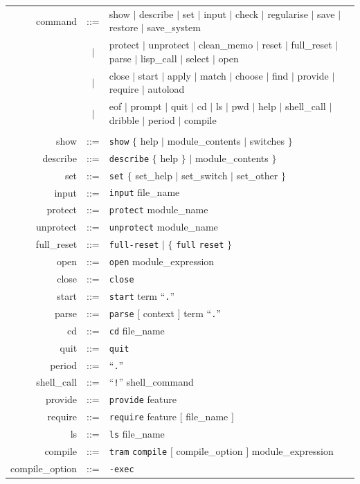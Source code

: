 \documentclass[a4paper]{memoir}
\begin{document}
\textit{}
\begin{tabular}{r c l}
  command &::=& show $|$ describe $|$ set $|$ input $|$ check $|$
    regularise $|$ save $|$ restore $|$ save\_system \\
  &$|$& protect $|$ unprotect $|$ clean\_memo $|$ reset $|$ full\_reset $|$
    parse $|$ lisp\_call $|$ select $|$ open \\
  &$|$& close $|$ start $|$ apply $|$ match $|$
    choose $|$ find $|$ provide $|$ require $|$ autoload \\
  &$|$& eof $|$ prompt $|$ quit $|$ cd $|$ ls $|$ pwd $|$ help $|$
    shell\_call $|$ dribble $|$ period $|$ compile \\
  \\
  show &::=& \verb|show| $\{$ help $|$ module\_contents $|$
    switches $\}$ \\
  describe &::=& \verb|describe| $\{$ help $\}$ $|$ module\_contents $\}$ \\
  set &::=& \verb|set| $\{$ set\_help $|$ set\_switch $|$ set\_other $\}$ \\
  input &::=& \verb|input| file\_name \\
  protect &::=& \verb|protect| module\_name \\
  unprotect &::=& \verb|unprotect| module\_name \\
  full\_reset &::=& \verb|full-reset| $|$ $\{$ \verb|full| \verb|reset| $\}$ \\
  open &::=& \verb|open| module\_expression \\
  close &::=& \verb|close| \\
  start &::=& \verb|start| term ``\verb|.|'' \\
  parse &::=& \verb|parse| $[$ context $]$ term ``\verb|.|'' \\
  cd &::=& \verb|cd| file\_name \\
  quit &::=& \verb|quit| \\
  period &::=& ``\verb|.|'' \\
  shell\_call &::=& ``\verb|!|'' shell\_command \\
  provide &::=& \verb|provide| feature \\
  require &::=& \verb|require| feature $[$ file\_name $]$ \\
  ls &::=& \verb|ls| file\_name \\
  compile &::=& \verb|tram| \verb|compile| $[$ compile\_option $]$
    module\_expression \\
  compile\_option &::=& \verb|-exec| \\

\end{tabular}
\end{document}
